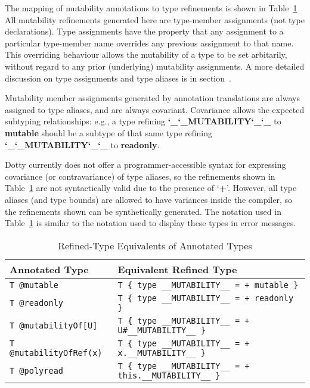 \documentclass[11pt]{report}
\newcommand{\und}{\char`_}
\newcommand{\MUTABILITY}{\und\und MUTABILITY\und\und }
\newcommand{\cdf}{\bf\ttfamily} %
\newcommand{\cd}{\cdf\small}  %
\begin{document}

The mapping of mutability annotations to type refinements is shown in Table~\ref{table:annotations-to-refinements} %
All mutability refinements generated here are type-member assignments (not type declarations). Type assignments have the property that any assignment to a particular type-member name overrides any previous assignment to that name. This overriding behaviour allows the mutability of a type to be set arbitarily, without regard to any prior (underlying) mutability assignments. A more detailed discussion on type assignments and type aliases is in section~\label{sec:type-aliases}.

Mutability member assignments generated by annotation translations are always assigned to type aliases, and are always covariant.
Covariance allows the expected subtyping relationships: e.g., a type refining {\cd \MUTABILITY} to {\cd mutable} should be a subtype of that same type refining {\cd \MUTABILITY} to {\cd readonly}.

Dotty currently does not offer a programmer-accessible syntax for expressing covariance (or contravariance) of type aliases, so the refinements shown in Table~\ref{table:annotations-to-refinements} are not syntactically valid due to the presence of `{\cd +}'. However, all type aliases (and type bounds) are allowed to have variances inside the compiler, so the refinements shown can be synthetically generated. The notation used in Table~\ref{table:annotations-to-refinements} is similar to the notation used to display these types in error messages.



\begin{table}[p]
\center
\begin{tabular}{ll}
Annotated Type & Equivalent Refined Type \\
\hline
\lstinline!T @mutable! & \lstinline!T { type __MUTABILITY__ = + mutable }! \\
\lstinline!T @readonly! & \lstinline!T { type __MUTABILITY__ = + readonly }! \\
\lstinline!T @mutabilityOf[U]! & \lstinline!T { type __MUTABILITY__ = + U#__MUTABILITY__ }! \\
\lstinline!T @mutabilityOfRef(x)! & \lstinline!T { type __MUTABILITY__ = + x.__MUTABILITY__ }! \\
\lstinline!T @polyread! & \lstinline!T { type __MUTABILITY__ = + this.__MUTABILITY__ }! \\
\end{tabular}
\caption{Refined-Type Equivalents of Annotated Types}
\label{table:annotations-to-refinements}
\end{table}
\end{document}
